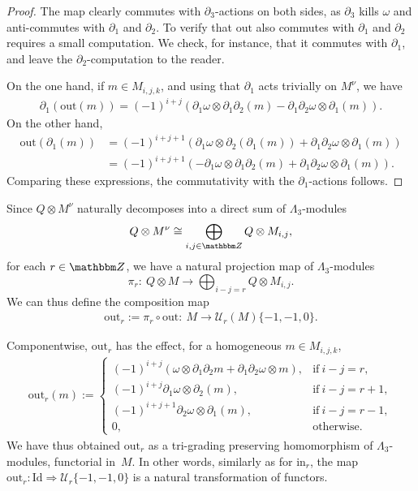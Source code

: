 \documentclass[10pt,a4paper]{amsart}
\theoremstyle{definition}
\numberwithin{equation}{section}
\def\Z{{\mathbbm Z}}
\def\dif{\partial}
\def\lra{{\longrightarrow}}
\def\Id{\mathrm{Id}}
\def\mc{\mathcal}
\begin{document}
\begin{proof}The map clearly commutes with $\dif_3$-actions on both sides, as $\dif_3$ kills $\omega$ and anti-commutes with $\dif_1$ and $\dif_2$. To verify that $\mathrm{out}$ also commutes with $\dif_1$ and $\dif_2$ requires a small computation. We check, for instance, that it commutes with $\dif_1$, and leave the $\dif_2$-computation to the reader.

On the one hand, if $m\in M_{i,j,k}$, and using that $\dif_1$ acts trivially on $M^\nu$, we have
\begin{gather*}
\dif_1(\mathrm{out}(m)) = (-1)^{i+j} (\dif_1\omega\otimes \dif_1\dif_2(m)-\dif_1\dif_2\omega\otimes \dif_1 (m)).
\end{gather*}
On the other hand,
\begin{align*}
\mathrm{out}(\dif_1(m))& = (-1)^{i+j+1}\left( \dif_1\omega \otimes \dif_2(\dif_1(m))+\dif_1\dif_2\omega\otimes \dif_1(m)\right) \nonumber\\
& = (-1)^{i+j+1}\left( - \dif_1\omega \otimes \dif_1\dif_2(m)+\dif_1\dif_2\omega\otimes \dif_1(m)\right) .
\end{align*}
Comparing these expressions, the commutativity with the $\dif_1$-actions follows.
\end{proof}

Since $Q\otimes M^\nu$ naturally decomposes into a direct sum of $\Lambda_3$-modules
\[
Q\otimes M^\nu\cong \bigoplus_{i,j\in \Z} Q\otimes M_{i,j},
\]
for each $r\in \Z$, we have a natural projection map of $\Lambda_3$-modules
\[
\pi_r\colon \ Q\otimes M\lra \bigoplus_{i-j=r} Q\otimes M_{i,j}.
\]
We can thus define the composition map
\begin{gather*}%
\mathrm{out}_r:=\pi_r\circ\mathrm{out}\colon \ M\lra \mc{U}_r(M)\{-1,-1,0\}.
\end{gather*}

Componentwise, $\mathrm{out}_r$ has the effect, for a homogeneous $m\in M_{i,j,k}$,
\begin{gather}\label{eqn-out-componentwise}
\mathrm{out}_r(m):=
\begin{cases}
(-1)^{i+j} (\omega \otimes \dif_1\dif_2 m+ \dif_1\dif_2\omega \otimes m), & \textrm{if}~i-j=r,\\
(-1)^{i+j}\dif_1\omega \otimes \dif_2(m), & \textrm{if}~i-j=r+1, \\
(-1)^{i+j+1} \dif_2\omega \otimes \dif_1(m), & \textrm{if}~i-j=r-1,\\
0, & \textrm{otherwise}.
\end{cases}
\end{gather}
We have thus obtained $\mathrm{out}_r$ as a tri-grading preserving homomorphism of $\Lambda_3$-modules, functorial in~$M$. In other words, similarly as for $\mathrm{in}_r$, the map $\mathrm{out}_r\colon \Id\Rightarrow \mc{U}_r\{-1,-1,0\}$ is a natural transformation of functors.
\end{document}
